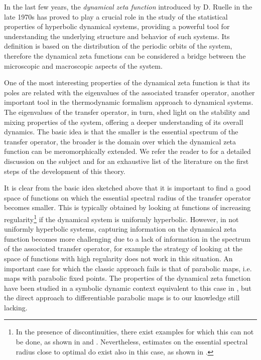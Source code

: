 \documentclass[11pt]{amsart}
\theoremstyle{definition}
\theoremstyle{remark}
\theoremstyle{definition}
\numberwithin{equation}{section}
\begin{document}
In the last few years, the \emph{dynamical zeta function} introduced by D. Ruelle in the late 1970s has proved to play a crucial role in the study of the statistical properties of hyperbolic dynamical systems, providing a powerful tool for understanding the underlying structure and behavior of such systems. Its definition is based on the distribution of the periodic orbits of the system, therefore the dynamical zeta functions can be considered a bridge between the microscopic and macroscopic aspects of the system.

One of the most interesting properties of the dynamical zeta function is that its poles are related with the eigenvalues of the associated transfer operator, another important tool in the thermodynamic formalism approach to dynamical systems.
The eigenvalues of the transfer operator, in turn, shed light on the stability and mixing properties of the system, offering a deeper understanding of its overall dynamics. The basic idea is that the smaller is the essential spectrum of the transfer operator, the broader is the domain over which the dynamical zeta function can be meromorphically extended. We refer the reader to \cite{bal-book-2} for a detailed discussion on the subject and for an exhaustive list of the literature on the first steps of the development of this theory. 

It is clear from the basic idea sketched above that it is important to find a good space of functions on which the essential spectral radius of the transfer operator becomes smaller. This is typically obtained by looking at functions of increasing regularity\footnote{In the presence of discontinuities, there exist examples for which this can not be done, as shown in \cite{BuCaJa} and \cite{BuCaCa}. Nevertheless, estimates on the essential spectral radius close to optimal do exist also in this case, as shown in \cite{BaCa}.} if the dynamical system is uniformly hyperbolic. However, in not uniformly hyperbolic systems, capturing information on the dynamical zeta function becomes more challenging due to a lack of information in the spectrum of the associated transfer operator, for example the strategy of looking at the space of functions with high regularity does not work in this situation. An important case for which the classic approach fails is that of parabolic maps, i.e. maps with parabolic fixed points. The properties of the dynamical zeta function have been studied in a symbolic dynamic context equivalent to this case in \cite{Is2}, but the direct approach to differentiable parabolic maps is to our knowledge still lacking.
\end{document}
